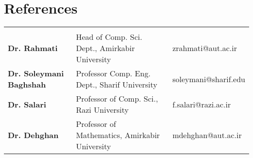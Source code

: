 

\section{References}\vspace{-1.0em}

\begin{tabularx}{\textwidth} { 
		>{\raggedright\arraybackslash}l
		>{\centering}X
		>{\raggedleft\arraybackslash}l }
	\multicolumn{3}{c}{} \\	%
	\textbf{Dr. Rahmati} & 
	Head of Comp. Sci. Dept., Amirkabir University   & 
	zrahmati@aut.ac.ir \\ 
	
	\textbf{Dr. Soleymani Baghshah} & 
	Professor Comp. Eng. Dept., Sharif University   & 
	soleymani@sharif.edu \\ 

		\textbf{Dr. Salari} &
	Professor of Comp. Sci., Razi University & 
	f.salari@razi.ac.ir \\
	
	\textbf{Dr. Dehghan} &
	Professor of Mathematics, Amirkabir University & 
	mdehghan@aut.ac.ir \\ 
 
	
	
\end{tabularx}